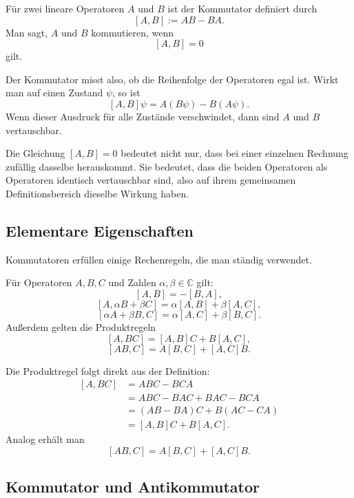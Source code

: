 \begin{definitionbox}
Für zwei lineare Operatoren $A$ und $B$ ist der Kommutator definiert durch
\[
    [A,B] := AB-BA.
\]
Man sagt, $A$ und $B$ kommutieren, wenn
\[
    [A,B]=0
\]
gilt.
\end{definitionbox}

Der Kommutator misst also, ob die Reihenfolge der Operatoren egal ist. Wirkt man auf einen Zustand $\psi$, so ist
\[
    [A,B]\psi = A(B\psi)-B(A\psi).
\]
Wenn dieser Ausdruck für alle Zustände verschwindet, dann sind $A$ und $B$ vertauschbar.

\begin{notebox}
Die Gleichung $[A,B]=0$ bedeutet nicht nur, dass bei einer einzelnen Rechnung zufällig dasselbe herauskommt. Sie bedeutet, dass die beiden Operatoren als Operatoren identisch vertauschbar sind, also auf ihrem gemeinsamen Definitionsbereich dieselbe Wirkung haben.
\end{notebox}

\subsection{Elementare Eigenschaften}

Kommutatoren erfüllen einige Rechenregeln, die man ständig verwendet.

\begin{formulabox}
Für Operatoren $A,B,C$ und Zahlen $\alpha,\beta\in\mathbb C$ gilt:
\[
    [A,B]=-[B,A],
\]
\[
    [A,\alpha B+\beta C]=\alpha[A,B]+\beta[A,C],
\]
\[
    [\alpha A+\beta B,C]=\alpha[A,C]+\beta[B,C].
\]
Außerdem gelten die Produktregeln
\[
    [A,BC]=[A,B]C+B[A,C],
\]
\[
    [AB,C]=A[B,C]+[A,C]B.
\]
\end{formulabox}

\begin{derivationbox}
Die Produktregel folgt direkt aus der Definition:
\[
\begin{aligned}
    [A,BC]
    &=ABC-BCA \\
    &=ABC-BAC+BAC-BCA \\
    &=(AB-BA)C+B(AC-CA) \\
    &=[A,B]C+B[A,C].
\end{aligned}
\]
Analog erhält man
\[
    [AB,C]=A[B,C]+[A,C]B.
\]
\end{derivationbox}

\subsection{Kommutator und Antikommutator}

